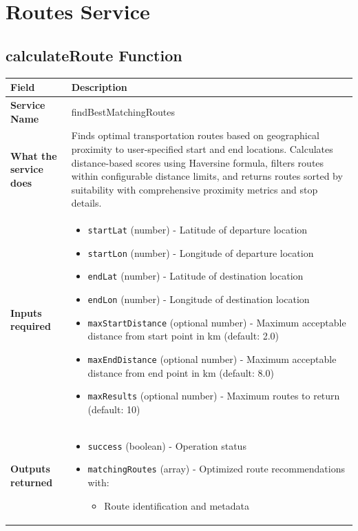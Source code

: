\documentclass[11pt,a4paper]{article}
\begin{document}
\section{Routes Service}


\subsection{calculateRoute Function}

\begin{longtable}{|p{3cm}|p{12cm}|}
\hline
\textbf{Field} & \textbf{Description} \\
\hline
\textbf{Service Name} & findBestMatchingRoutes \\
\hline
\textbf{What the service does} & 
Finds optimal transportation routes based on geographical proximity to user-specified start and end locations. Calculates distance-based scores using Haversine formula, filters routes within configurable distance limits, and returns routes sorted by suitability with comprehensive proximity metrics and stop details. \\
\hline
\textbf{Inputs required} & 
\begin{itemize}[nosep]
\item \texttt{startLat} (number) - Latitude of departure location
\item \texttt{startLon} (number) - Longitude of departure location
\item \texttt{endLat} (number) - Latitude of destination location
\item \texttt{endLon} (number) - Longitude of destination location
\item \texttt{maxStartDistance} (optional number) - Maximum acceptable distance from start point in km (default: 2.0)
\item \texttt{maxEndDistance} (optional number) - Maximum acceptable distance from end point in km (default: 8.0)
\item \texttt{maxResults} (optional number) - Maximum routes to return (default: 10)
\end{itemize} \\
\hline
\textbf{Outputs returned} & 
\begin{itemize}[nosep]
\item \texttt{success} (boolean) - Operation status
\item \texttt{matchingRoutes} (array) - Optimized route recommendations with:
  \begin{itemize}[nosep]
  \item Route identification and metadata

\end{itemize}
\end{itemize}
\end{longtable}
\end{document}

